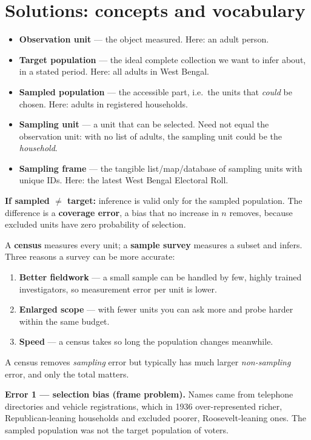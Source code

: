 \section{Solutions: concepts and vocabulary}
\setcounter{qq}{0}

\sol
\begin{itemize}
  \item \textbf{Observation unit} --- the object measured. Here: an adult person.
  \item \textbf{Target population} --- the ideal complete collection we want to infer about, in a
        stated period. Here: all adults in West Bengal.
  \item \textbf{Sampled population} --- the accessible part, i.e.\ the units that \emph{could} be
        chosen. Here: adults in registered households.
  \item \textbf{Sampling unit} --- a unit that can be selected. Need not equal the observation
        unit: with no list of adults, the sampling unit could be the \emph{household}.
  \item \textbf{Sampling frame} --- the tangible list/map/database of sampling units with unique
        IDs. Here: the latest West Bengal Electoral Roll.
\end{itemize}
\textbf{If sampled $\ne$ target:} inference is valid only for the sampled population. The
difference is a \textbf{coverage error}, a bias that no increase in $n$ removes, because excluded
units have zero probability of selection.

\sol A \textbf{census} measures every unit; a \textbf{sample survey} measures a subset and infers.
Three reasons a survey can be more accurate:
\begin{enumerate}
  \item \textbf{Better fieldwork} --- a small sample can be handled by few, highly trained
        investigators, so measurement error per unit is lower.
  \item \textbf{Enlarged scope} --- with fewer units you can ask more and probe harder within the
        same budget.
  \item \textbf{Speed} --- a census takes so long the population changes meanwhile.
\end{enumerate}
A census removes \emph{sampling} error but typically has much larger \emph{non-sampling} error,
and only the total matters.

\sol \textbf{Error 1 --- selection bias (frame problem).} Names came from telephone directories
and vehicle registrations, which in 1936 over-represented richer, Republican-leaning households
and excluded poorer, Roosevelt-leaning ones. The sampled population was not the target
population of voters.

